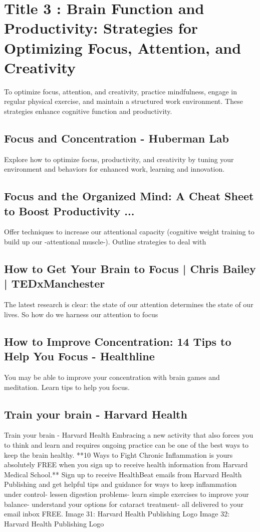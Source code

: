 \documentclass[12pt]{article}
\begin{document}
\section{Title 3 : Brain Function and Productivity: Strategies for Optimizing Focus, Attention, and Creativity}
To optimize focus, attention, and creativity, practice mindfulness, engage in regular physical exercise, and maintain a structured work environment. These strategies enhance cognitive function and productivity.\subsection{Focus and Concentration - Huberman Lab}
Explore how to optimize focus, productivity, and creativity by tuning your environment and behaviors for enhanced work, learning and innovation.\subsection{Focus and the Organized Mind: A Cheat Sheet to Boost Productivity ...}
Offer techniques to increase our attentional capacity (cognitive weight training to build up our -attentional muscle-). Outline strategies to deal with\subsection{How to Get Your Brain to Focus | Chris Bailey | TEDxManchester}
The latest research is clear: the state of our attention determines the state of our lives. So how do we harness our attention to focus\subsection{How to Improve Concentration: 14 Tips to Help You Focus - Healthline}
You may be able to improve your concentration with brain games and meditation. Learn tips to help you focus.\subsection{Train your brain - Harvard Health}
Train your brain - Harvard Health Embracing a new activity that also forces you to think and learn and requires ongoing practice can be one of the best ways to keep the brain healthy. **10 Ways to Fight Chronic Inflammation is yours absolutely FREE when you sign up to receive health information from Harvard Medical School.** Sign up to receive HealthBeat emails from Harvard Health Publishing and get helpful tips and guidance for ways to keep inflammation under control- lessen digestion problems- learn simple exercises to improve your balance- understand your options for cataract treatment- all delivered to your email inbox FREE. Image 31: Harvard Health Publishing Logo Image 32: Harvard Health Publishing Logo
\end{document}
